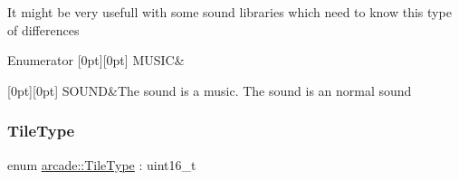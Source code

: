 It might be very usefull with some sound libraries which need to know this type of differences \begin{DoxyEnumFields}{Enumerator}
[0pt][0pt]{}\mbox{\label{namespacearcade_a3bb4743a2eea59f3927e404e6549cae5a5a4967c8f21ad70ba0e0459a0add50f0}} 
M\+U\+S\+IC&\\
\hline

[0pt][0pt]{}\mbox{\label{namespacearcade_a3bb4743a2eea59f3927e404e6549cae5a37f1d8b7897a8b789c2dd953b53416ef}} 
S\+O\+U\+ND&The sound is a music. The sound is an normal sound \\
\hline

\end{DoxyEnumFields}
\mbox{\label{namespacearcade_a61ba576694ea309cdf2b4b66902408ca}} 
\subsubsection{\texorpdfstring{Tile\+Type}{TileType}\hspace{0.1cm}{\footnotesize\ttfamily [1/2]}}
{\footnotesize\ttfamily enum \hyperlink{namespacearcade_a61ba576694ea309cdf2b4b66902408ca}{arcade\+::\+Tile\+Type} \+: uint16\+\_\+t\hspace{0.3cm}{\ttfamily [strong]}}

